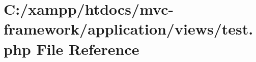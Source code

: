 \hypertarget{application_2views_2test_8php}{}\section{C\+:/xampp/htdocs/mvc-\/framework/application/views/test.php File Reference}
\label{application_2views_2test_8php}
